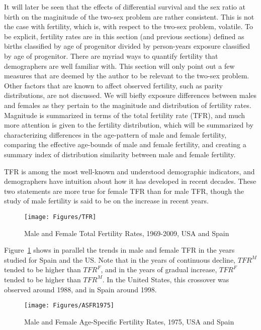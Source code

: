  \FloatBarrier
 \label{sec:dimorphASFR}
 
It will later be seen that the effects of differential survival and the
sex ratio at birth on the maginitude of the two-sex problem are rather
consistent. This is not the case with fertility, which is, with respect
to the two-sex problem, volatile. To be explicit, fertility rates are in this
section (and previous sections) defined as births classified by age of
progenitor divided by person-years exposure classified by age of progenitor.
There are myriad ways to quantify fertility that demographers are well familiar
with. This section will only point out a few measures that are deemed by the
author to be relevant to the two-sex problem. Other factors that are known to
affect observed fertility, such as parity distributions, are not discussed. We
will biefly exposure differences between males and females as they pertain to
the maginitude and distribution of fertility rates. Magnitude is summarized in
terms of the total fertility rate (TFR), and much more attention is given to the
fertility distribution, which will be summarized by characterizing differences
in the age-pattern of male and female fertility, comparing the effective
age-bounds of male and female fertility, and creating a summary index of
distribution similarity between male and female fertility.

TFR is among the most well-known and understood demographic indicators, and
demographers have intuition about how it has developed in recent decades. These
two statements are more true for female TFR than for male TFR, though the study
of male fertility is said to be on the increase in recent years.

\begin{figure}[ht!]
        \centering  
          \caption{Male and Female Total Fertility Rates, 1969-2009, USA and
          Spain}
           \texttt{[image: Figures/TFR]}
          \label{fig:TFRseries}
\end{figure}

Figure~\ref{fig:TFRseries} shows in parallel the trends in male and female TFR
in the years studied for Spain and the US. Note that
in the years of continuous decline, $TFR^M$ tended to be higher than $TFR^F$,
and in the years of gradual increase, $TFR^F$ tended to be higher than $TFR^M$. In the United States,
this crossover was observed around 1988, and in Spain around 1998. 

\begin{figure}[ht!]
        \centering  
          \caption{Male and Female Age-Specific Fertility Rates, 1975, USA and
          Spain}
           \texttt{[image: Figures/ASFR1975]}  
          \label{fig:ASFR1975}
\end{figure}

